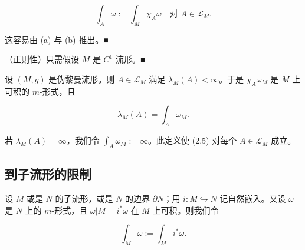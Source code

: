 \begin{remark}
\begin{items}
\[
\int_A \omega := \int_M \chi_A \omega \quad \text{对 } A \in \mathcal{L}_M .
\]

\proofhead
这容易由 (a) 与 (b) 推出。\nobreak\hspace{0.35em}■
\item

（正则性）只需假设 $ M $ 是 $ C^1 $ 流形。\nobreak\hspace{0.35em}■

\end{items}

设 $ (M, g) $ 是伪黎曼流形。则 $ A \in \mathcal{L}_M $ 满足 $ \lambda_M(A) < \infty $。于是 $ \chi_A \omega_M $ 是 $ M $ 上可积的 $ m $-形式，且

\begin{equation}
\lambda_M(A) = \int_A \omega_M .\tag{2.5}
\end{equation}

若 $ \lambda_M(A) = \infty $，我们令 $ \int_A \omega_M := \infty $。此定义使 (2.5) 对每个 $ A \in \mathcal{L}_M $ 成立。

\end{remark}

\subsection*{到子流形的限制}

设 $ M $ 或是 $ N $ 的子流形，或是 $ N $ 的边界 $ \partial N $；用 $ i : M \hookrightarrow N $ 记自然嵌入。又设 $ \omega $ 是 $ N $ 上的 $ m $-形式，且 $ \omega|M = i^* \omega $ 在 $ M $ 上可积。则我们令

\begin{equation}
\int_M \omega := \int_M i^* \omega .\tag{2.6}
\end{equation}

